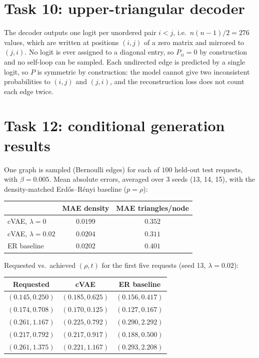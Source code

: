 \documentclass[a4paper]{article}
\begin{document}
\section{Task 10: upper-triangular decoder}

The decoder outputs one logit per unordered pair $i < j$, i.e.\ $n(n-1)/2 = 276$ values, which are written at positions $(i, j)$ of a zero matrix and mirrored to $(j, i)$. No logit is ever assigned to a diagonal entry, so $P_{ii} = 0$ by construction and no self-loop can be sampled. Each undirected edge is predicted by a single logit, so $P$ is symmetric by construction: the model cannot give two inconsistent probabilities to $(i, j)$ and $(j, i)$, and the reconstruction loss does not count each edge twice.


\section{Task 12: conditional generation results}

One graph is sampled (Bernoulli edges) for each of $100$ held-out test requests, with $\beta = 0.005$. Mean absolute errors, averaged over 3 seeds (13, 14, 15), with the density-matched Erd\H{o}s--R\'enyi baseline ($p = \rho$):

\begin{center}
\begin{tabular}{l|c|c}
     & MAE density & MAE triangles/node \\
    \hline
    cVAE, $\lambda = 0$    & $0.0199$ & $0.352$ \\
    cVAE, $\lambda = 0.02$ & $0.0204$ & $\mathbf{0.311}$ \\
    ER baseline            & $0.0202$ & $0.401$ \\
\end{tabular}
\end{center}

Requested vs.\ achieved $(\rho, t)$ for the first five requests (seed 13, $\lambda = 0.02$):
\begin{center}
\begin{tabular}{c|c|c}
    Requested & cVAE & ER baseline \\
    \hline
    $(0.145, 0.250)$ & $(0.185, 0.625)$ & $(0.156, 0.417)$ \\
    $(0.174, 0.708)$ & $(0.170, 0.125)$ & $(0.127, 0.167)$ \\
    $(0.261, 1.167)$ & $(0.225, 0.792)$ & $(0.290, 2.292)$ \\
    $(0.217, 0.792)$ & $(0.217, 0.917)$ & $(0.188, 0.500)$ \\
    $(0.261, 1.375)$ & $(0.221, 1.167)$ & $(0.293, 2.208)$ \\
\end{tabular}
\end{center}
\end{document}
